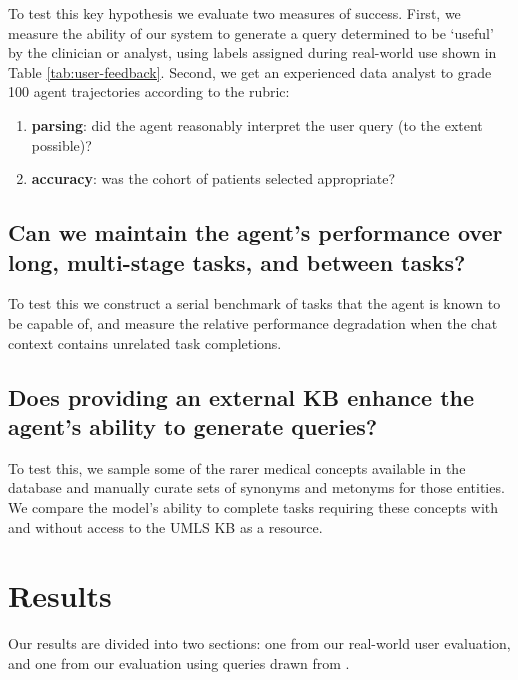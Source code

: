 \documentclass[11pt]{article}
\begin{document}
To test this key hypothesis we evaluate two measures of success.
First, we measure the ability of our system to generate a query determined to be `useful' by the clinician or analyst, using labels assigned during real-world use shown in Table \ref{tab:user-feedback}.
Second, we get an experienced data analyst to grade 100 agent trajectories according to the rubric:
\begin{enumerate}
	\item \textbf{parsing}: did the agent reasonably interpret the user query (to the extent possible)?
	\item \textbf{accuracy}: was the cohort of patients selected appropriate? 
\end{enumerate}


\subsection*{Can we maintain the agent's performance over long, multi-stage tasks, and between tasks?}

To test this we construct a serial benchmark of tasks that the agent is known to be capable of, and measure the relative performance degradation when the chat context contains unrelated task completions.

\subsection*{Does providing an external KB enhance the agent's ability to generate queries?}

To test this, we sample some of the rarer medical concepts available in the database and manually curate sets of synonyms and metonyms for those entities.
We compare the model's ability to complete tasks requiring these concepts with and without access to the UMLS KB as a resource.

\section{Results}
Our results are divided into two sections: one from our real-world user evaluation, and one from our evaluation using queries drawn from \citet{ziletti_generating_2025}.
\end{document}
